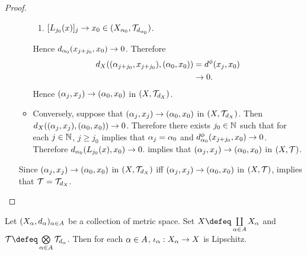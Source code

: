 \documentclass{book}
\begin{document}
\begin{proof}
\begin{enumerate}
\begin{itemize}
\begin{enumerate}
				\item $[L_{j_0}(x)]_j \rightarrow x_0 \in (X_{\alpha_0}, \mathcal{T}_{d_{\alpha_0}})$.
			\end{enumerate}
			Hence $d_{\alpha_0}(x_{j+j_0}, x_0) \rightarrow 0$. Therefore 
			\begin{align*}
				d_X((\alpha_{j+j_0}, x_{j+j_0}), (\alpha_0, x_0))
				& = d^{\phi}(x_j, x_0) \\
				& \rightarrow 0.
			\end{align*}
			Hence $(\alpha_j, x_j) \rightarrow (\alpha_0, x_0)$ in $(X, \mathcal{T}_{d_X})$.
			\item Conversely, suppose that $(\alpha_j, x_j) \rightarrow (\alpha_0, x_0)$ in $(X, \mathcal{T}_{d_X})$. Then $d_X((\alpha_j, x_j), (\alpha_0, x_0)) \rightarrow 0$. Therefore there exists $j_0 \in \mathbb{N}$ such that for each $j \in \mathbb{N}$, $j \geq j_0$ implies that $\alpha_j = \alpha_0$ and $d_{\alpha_0}^{\phi}(x_{j+j_0}, x_0) \rightarrow 0$. Therefore $d_{\alpha_0}(L_{j_0}(x), x_0) \rightarrow 0$.  implies that $(\alpha_j, x_j) \rightarrow (\alpha_0, x_0)$ in $(X, \mathcal{T})$. 
		\end{itemize}
		Since $(\alpha_j, x_j) \rightarrow (\alpha_0, x_0)$ in $(X, \mathcal{T}_{d_X})$ iff $(\alpha_j, x_j) \rightarrow (\alpha_0, x_0)$ in $(X, \mathcal{T})$,  implies that $\mathcal{T} = \mathcal{T}_{d_X}$. 
	\end{enumerate}
\end{proof}

\begin{ex} 
	Let $(X_{\alpha}, d_{\alpha})_{\alpha \in A}$ be a collection of metric space. Set $X \defeq \coprod\limits_{\al \in A} X_{\al}$ and $\MT \defeq \bigotimes\limits_{\al \in A} \MT_{d_{\al}}$. Then for each $\alpha \in A$, $\iota_{\alpha}:X_{\alpha} \rightarrow X$ is Lipschitz.
\end{ex}
\end{document}
